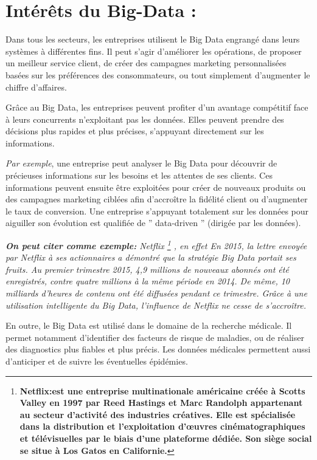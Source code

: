 \section{Intérêts du Big-Data :}
Dans tous les secteurs, les entreprises utilisent le Big Data engrangé dans leurs systèmes à différentes fins. Il peut s'agir d'améliorer les opérations, de proposer un meilleur service client, de créer des campagnes marketing personnalisées basées sur les préférences des consommateurs, ou tout simplement d'augmenter le chiffre d'affaires.

Grâce au Big Data, les entreprises peuvent profiter d'un avantage compétitif face à leurs concurrents n'exploitant pas les données. Elles peuvent prendre des décisions plus rapides et plus précises, s'appuyant directement sur les informations.

\textit{Par exemple}, une entreprise peut analyser le Big Data pour découvrir de précieuses informations sur les besoins et les attentes de ses clients. Ces informations peuvent ensuite être exploitées pour créer de nouveaux produits ou des campagnes marketing ciblées afin d'accroître la fidélité client ou d'augmenter le taux de conversion. Une entreprise s'appuyant totalement sur les données pour aiguiller son évolution est qualifiée de ” data-driven ” (dirigée par les données).

\textit{\textbf{On peut citer comme exemple:} Netflix \footnote{\textbf{Netflix:est une entreprise multinationale américaine créée à Scotts Valley en 1997 par Reed Hastings et Marc Randolph appartenant au secteur d'activité des industries créatives. Elle est spécialisée dans la distribution et l'exploitation d'œuvres cinématographiques et télévisuelles par le biais d'une plateforme dédiée. Son siège social se situe à Los Gatos en Californie. }} , en effet En 2015, la lettre envoyée par Netflix à ses actionnaires a démontré que la stratégie Big Data portait ses fruits. Au premier trimestre 2015, 4,9 millions de nouveaux abonnés ont été enregistrés, contre quatre millions à la même période en 2014. De même, 10 milliards d'heures de contenu ont été diffusées pendant ce trimestre. Grâce à une utilisation intelligente du Big Data, l'influence de Netflix ne cesse de s'accroître.}\cite{lebigdata.fr}

En outre, le Big Data est utilisé dans le domaine de la recherche médicale. Il permet notamment d'identifier des facteurs de risque de maladies, ou de réaliser des diagnostics plus fiables et plus précis. Les données médicales permettent aussi d'anticiper et de suivre les éventuelles épidémies.

